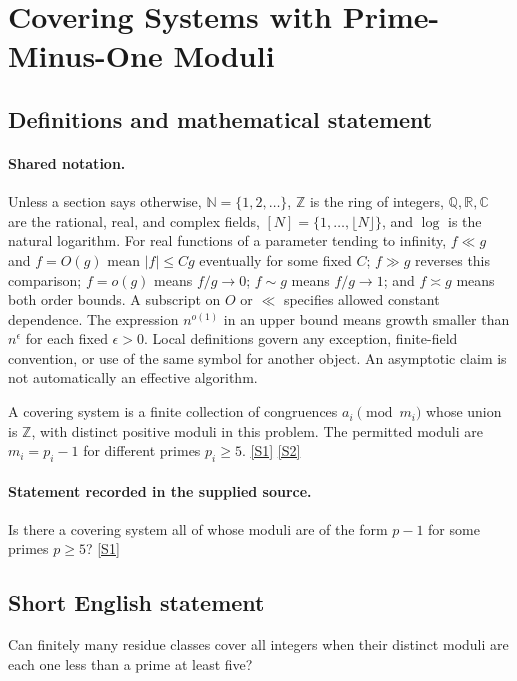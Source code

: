 \documentclass[11pt,a4paper]{article}
\newcommand{\N}{\mathbb{N}}
\newcommand{\Z}{\mathbb{Z}}
\newcommand{\Q}{\mathbb{Q}}
\newcommand{\R}{\mathbb{R}}
\newcommand{\C}{\mathbb{C}}
\newcommand{\sref}[2]{\hyperlink{source:#1:#2}{[S#2]}}
\begin{document}
\section{Covering Systems with Prime-Minus-One Moduli}\label{statement}


\subsection{Definitions and mathematical statement}

\paragraph{Shared notation.}Unless a section says otherwise, $\N=\{1,2,\ldots\}$,
$\Z$ is the ring of integers, $\Q,\R,\C$ are the rational, real, and complex
fields, $[N]=\{1,\ldots,\lfloor N\rfloor\}$, and $\log$ is the natural
logarithm. For real functions of a parameter tending to infinity,
$f\ll g$ and $f=O(g)$ mean $|f|\leq Cg$ eventually for some fixed $C$;
$f\gg g$ reverses this comparison; $f=o(g)$ means $f/g\to0$;
$f\sim g$ means $f/g\to1$; and $f\asymp g$ means both order bounds.
A subscript on $O$ or $\ll$ specifies allowed constant dependence.
The expression $n^{o(1)}$ in an upper bound means growth smaller than
$n^\epsilon$ for each fixed $\epsilon>0$. Local definitions govern any
exception, finite-field convention, or use of the same symbol for another
object. An asymptotic claim is not automatically an effective algorithm.



A covering system is a finite collection of congruences $a_i\pmod{m_i}$ whose union is $\Z$, with distinct positive moduli in this problem. The permitted moduli are $m_i=p_i-1$ for different primes $p_i\geq5$. \sref{statement}{1} \sref{statement}{2}

\paragraph{Statement recorded in the supplied source.}
Is there a covering system all of whose moduli are of the form $p-1$ for some primes $p\geq 5$? \sref{statement}{1}

\subsection{Short English statement}

Can finitely many residue classes cover all integers when their distinct moduli are each one less than a prime at least five?
\end{document}
